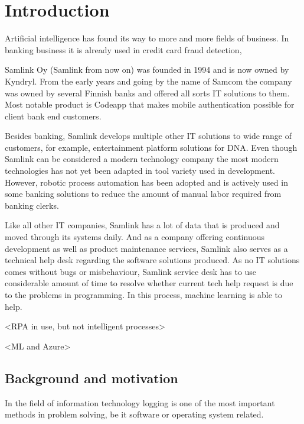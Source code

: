 \documentclass[english, 12pt, a4paper, elec, utf8, a-1b, online]{aaltothesis}
\begin{document}
\section{Introduction}\label{sec:introduction}

\thispagestyle{empty}
Artificial intelligence has found its way to
more and more fields of business.
In banking business it is already used in
credit card fraud detection, %


Samlink Oy (Samlink from now on)
was founded in 1994
and is now owned by Kyndryl.
From the early years
and going by the name of Samcom
the company was owned by several Finnish banks
and offered all sorts IT solutions to them.
Most notable product is Codeapp
that makes mobile authentication possible
for client bank end customers.

Besides banking,
Samlink develops multiple other IT solutions
to wide range of customers,
for example,
entertainment platform solutions for DNA.
Even though Samlink can be considered
a modern technology company
the most modern technologies has not yet been adapted
in tool variety used in development.
However,
robotic process automation has been adopted
and is actively used in some
banking solutions to reduce
the amount of manual labor required
from banking clerks.

Like all other IT companies,
Samlink has a lot of data that is produced
and moved through its systems daily.
And as a company offering continuous development
as well as product maintenance services,
Samlink also serves as a technical help desk
regarding the software solutions produced.
As no IT solutions comes without bugs or misbehaviour,
Samlink service desk has to use considerable amount of time
to resolve whether current tech help request
is due to the problems in programming.
In this process, machine learning is able to help.

<RPA in use, but not intelligent processes>

<ML and Azure>

\subsection{Background and motivation}\label{subsec:background-and-motivation}
In the field of information technology
logging is one of the most important methods
in problem solving,
be it software or operating system related.\cite{delarosa2018log}
\end{document}
